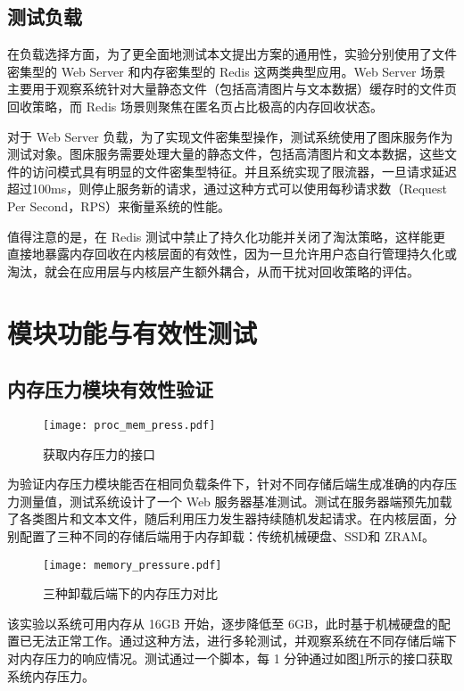 \subsection{测试负载}

在负载选择方面，为了更全面地测试本文提出方案的通用性，实验分别使用了文件密集型的 Web Server 和内存密集型的 Redis 这两类典型应用。Web Server 场景主要用于观察系统针对大量静态文件（包括高清图片与文本数据）缓存时的文件页回收策略，而 Redis 场景则聚焦在匿名页占比极高的内存回收状态。

对于 Web Server 负载，为了实现文件密集型操作，测试系统使用了图床服务作为测试对象。图床服务需要处理大量的静态文件，包括高清图片和文本数据，这些文件的访问模式具有明显的文件密集型特征。并且系统实现了限流器，一旦请求延迟超过100ms，则停止服务新的请求，通过这种方式可以使用每秒请求数（Request Per Second，RPS）来衡量系统的性能。

值得注意的是，在 Redis 测试中禁止了持久化功能并关闭了淘汰策略，这样能更直接地暴露内存回收在内核层面的有效性，因为一旦允许用户态自行管理持久化或淘汰，就会在应用层与内核层产生额外耦合，从而干扰对回收策略的评估。



\section{模块功能与有效性测试}

\subsection{内存压力模块有效性验证}


\begin{figure}[htb]
    \centering
    \texttt{[image: proc\_mem\_press.pdf]}
    \caption{获取内存压力的接口}
    \label{fig:proc_mem_press}
\end{figure}

为验证内存压力模块能否在相同负载条件下，针对不同存储后端生成准确的内存压力测量值，测试系统设计了一个 Web 服务器基准测试。测试在服务器端预先加载了各类图片和文本文件，随后利用压力发生器持续随机发起请求。在内核层面，分别配置了三种不同的存储后端用于内存卸载：传统机械硬盘、SSD和 ZRAM。

\begin{figure}[htb]
    \centering
    \texttt{[image: memory\_pressure.pdf]}
    \caption{三种卸载后端下的内存压力对比}
    \label{fig:memory_pressure}
\end{figure}
该实验以系统可用内存从 16GB 开始，逐步降低至 6GB，此时基于机械硬盘的配置已无法正常工作。通过这种方法，进行多轮测试，并观察系统在不同存储后端下对内存压力的响应情况。测试通过一个脚本，每 1 分钟通过如图\ref{fig:proc_mem_press}所示的接口获取系统内存压力。

